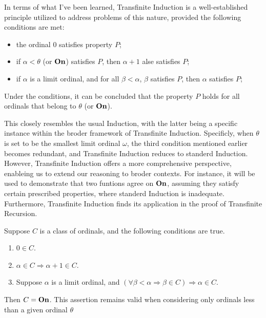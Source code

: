 In terms of what I've been learned, 
Transfinite Induction is a well-established principle utilized to address problems of this nature, provided the following conditions are met:
\begin{itemize}
  \item the ordinal $0$ satisfies property $P$;
  \item if $\alpha < \theta$ (or $\boldsymbol{\mathrm{On}}$) satisfies $P$, then $\alpha + 1$ alse satisfies $P$;
  \item if $\alpha$ is a limit ordinal, and for all $\beta < \alpha$, $\beta$ satisfies $P$, then $\alpha$ satisfies $P$;
\end{itemize}
Under the conditions, it can be concluded that the property $P$ holds for all ordinals that belong to $\theta$ (or $\boldsymbol{\mathrm{On}}$).


This closely resembles the usual Induction, with the latter being a specific instance within the broder framework of Transfinite Induction. Specificly, when $\theta$ is set to be the smallest limit ordinal $\omega$, the third condition mentioned earlier becomes redundant, and Transfinite Induction reduces to standerd Induction. However, Transfinite Induction offers a more comprehensive perspective, enableing us to extend our reasoning to broder contexts. For instance, it will be used to demonstrate that two funtions agree on $\boldsymbol{\mathrm{On}}$, assuming they satisfy certain prescribed properties, where standerd Induction is inadequate. Furthermore, Transfinite Induction finds its application in the proof of Transfinite Recursion.

\begin{theorem}
  Suppose $C$ is a class of ordinals, and the following conditions are true.
  \begin{enumerate}
    \item $0 \in C$.
    \item $\alpha \in C \Rightarrow \alpha + 1 \in C$.
    \item Suppose $\alpha$ is a limit ordinal, and $(\forall \beta < \alpha \Rightarrow \beta \in C) \Rightarrow \alpha \in C$.
  \end{enumerate}
  Then $C = \boldsymbol{\mathrm{On}}$. This assertion remains valid when considering only ordinals less than a given ordinal $\theta$
\end{theorem}

